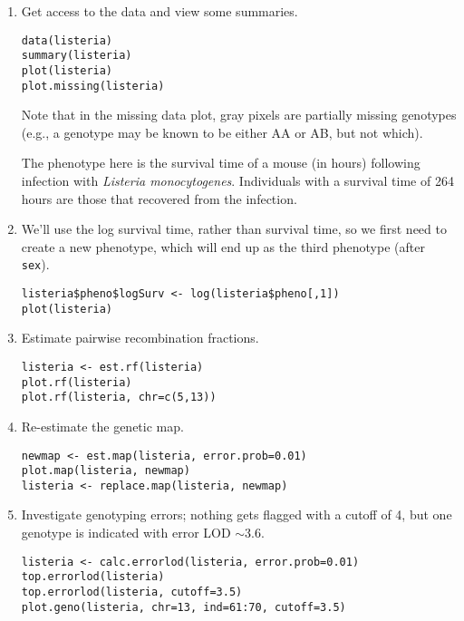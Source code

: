 \documentclass[10pt,letterpaper]{article}
\newcommand{\usercolor}{\color [named]{BlueViolet}}
\begin{document}
\begin{enumerate}
\item Get access to the data and view some summaries.

\usercolor 
\verb|data(listeria)| \\
\verb|summary(listeria)| \\
\verb|plot(listeria)| \\
\verb|plot.missing(listeria)| 
\normalcolor

Note that in the missing data plot, gray pixels are partially missing
genotypes (e.g., a genotype may be known to be either AA or AB, but
not which).

The phenotype here is the survival time of a mouse (in hours)
following infection with \emph{Listeria monocytogenes}.  Individuals
with a survival time of 264 hours are those that recovered from the
infection.

\item We'll use the log survival time, rather than survival time, so
  we first need to create a new phenotype, which will end up as the
  third phenotype (after \verb-sex-).

\usercolor
\verb|listeria$pheno$logSurv <- log(listeria$pheno[,1])| \\ %
\verb|plot(listeria)| \normalcolor

\item Estimate pairwise recombination fractions.

\usercolor \verb|listeria <- est.rf(listeria)| \\
\verb|plot.rf(listeria)| \\
\verb|plot.rf(listeria, chr=c(5,13))| 
\normalcolor

\item Re-estimate the genetic map. 
 
\usercolor 
\verb|newmap <- est.map(listeria, error.prob=0.01)| \\
\verb|plot.map(listeria, newmap)| \\
\verb|listeria <- replace.map(listeria, newmap)|
\normalcolor

\item Investigate genotyping errors; nothing gets flagged with a
  cutoff of 4, but one genotype is indicated with error LOD
  $\sim$3.6. 

\usercolor 
\verb|listeria <- calc.errorlod(listeria, error.prob=0.01)| \\
\verb|top.errorlod(listeria)| \\
\verb|top.errorlod(listeria, cutoff=3.5)| \\
\verb|plot.geno(listeria, chr=13, ind=61:70, cutoff=3.5)|
\normalcolor


\end{enumerate}
\end{document}
